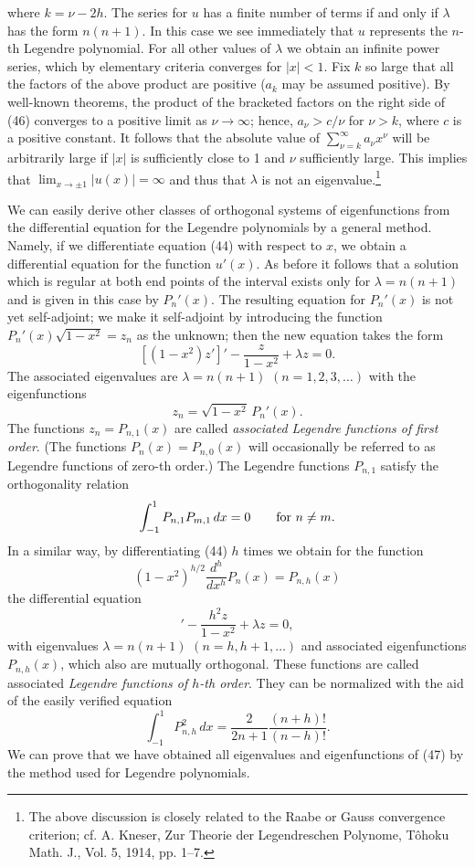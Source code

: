 where $k=\nu-2h$. The series for $u$ has a finite number of terms if and only if $\lambda$ has the form $n(n+1)$. In this case we see immediately that $u$ represents the $n$-th Legendre polynomial. For all other values of $\lambda$ we obtain an infinite power series, which by elementary criteria converges for $|x|<1$. Fix $k$ so large that all the factors of the above product are positive ($a_k$ may be assumed positive). By well-known theorems, the product of the bracketed factors on the right side of (46) converges to a positive limit as $\nu\to\infty$; hence, $a_\nu>c/\nu$ for $\nu>k$, where $c$ is a positive constant. It follows that the absolute value of $\sum_{\nu=k}^{\infty}a_\nu x^\nu$ will be arbitrarily large if $|x|$ is sufficiently close to 1 and $\nu$ sufficiently large. This implies that $\lim_{x\to\pm1}|u(x)|=\infty$ and thus that $\lambda$ is not an eigenvalue.\footnote{The above discussion is closely related to the Raabe or Gauss convergence criterion; cf. A. Kneser, Zur Theorie der Legendreschen Polynome, T\^ohoku Math. J., Vol. 5, 1914, pp. 1--7.}

We can easily derive other classes of orthogonal systems of eigenfunctions from the differential equation for the Legendre polynomials by a general method. Namely, if we differentiate equation (44) with respect to $x$, we obtain a differential equation for the function $u'(x)$. As before it follows that a solution which is regular at both end points of the interval exists only for $\lambda=n(n+1)$ and is given in this case by $P_n'(x)$. The resulting equation for $P_n'(x)$ is not yet self-adjoint; we make it self-adjoint by introducing the function $P_n'(x)\sqrt{1-x^2}=z_n$ as the unknown; then the new equation takes the form
\[
[(1-x^2)z']'-\frac{z}{1-x^2}+\lambda z=0.
\]
The associated eigenvalues are $\lambda=n(n+1)$ $(n=1,2,3,\ldots)$ with the eigenfunctions
\[
z_n=\sqrt{1-x^2}\,P_n'(x).
\]
The functions $z_n=P_{n,1}(x)$ are called \emph{associated Legendre functions of first order}. (The functions $P_n(x)=P_{n,0}(x)$ will occasionally be referred to as Legendre functions of zero-th order.) The Legendre functions $P_{n,1}$ satisfy the orthogonality relation
\[
\int_{-1}^{1}P_{n,1}P_{m,1}\,dx=0\qquad\hbox{for }n\ne m.
\]
In a similar way, by differentiating (44) $h$ times we obtain for the function
\[
(1-x^2)^{h/2}\frac{d^h}{dx^h}P_n(x)=P_{n,h}(x)
\]
the differential equation
\begin{equation}
[(1-x^2)z']'-\frac{h^2z}{1-x^2}+\lambda z=0,
\tag{47}
\end{equation}
with eigenvalues $\lambda=n(n+1)$ $(n=h,h+1,\ldots)$ and associated eigenfunctions $P_{n,h}(x)$, which also are mutually orthogonal. These functions are called associated \emph{Legendre functions of $h$-th order}. They can be normalized with the aid of the easily verified equation
\[
\int_{-1}^{1}P_{n,h}^2\,dx=\frac{2}{2n+1}\frac{(n+h)!}{(n-h)!}.
\]
We can prove that we have obtained all eigenvalues and eigenfunctions of (47) by the method used for Legendre polynomials.

